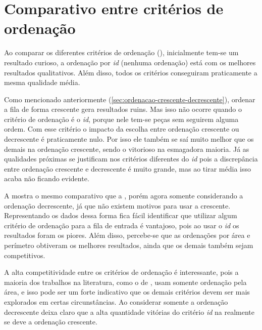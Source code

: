 \section{Comparativo entre critérios de ordenação}\label{sec:comparativo-entre-criterios-de-ordenacao}

Ao comparar os diferentes critérios de ordenação (), inicialmente tem-se
um resultado curioso, a ordenação por \textit{id} (nenhuma ordenação) está com os melhores
resultados qualitativos.
Além disso, todos os critérios conseguiram praticamente a mesma qualidade média.



Como mencionado anteriormente (\cref{sec:ordenacao-crescente-decrescente}), ordenar a fila de
forma crescente gera resultados ruins.
Mas isso não ocorre quando o critério de ordenação é o \textit{id}, porque nele tem-se peças
sem seguirem alguma ordem.
Com esse critério o impacto da escolha entre ordenação crescente ou decrescente é praticamente
nulo.
Por isso ele também se saí muito melhor que os demais na ordenação crescente, sendo o vitorioso
na esmagadora maioria.
Já as qualidades próximas se justificam nos critérios diferentes do \textit{id} pois a
discrepância entre ordenação crescente e decrescente é muito grande, mas ao tirar média isso acaba
não ficando evidente.

A  mostra o mesmo comparativo que a , porém agora
somente considerando a ordenação decrescente, já que não existem motivos para usar a crescente.
Representando os dados dessa forma fica fácil identificar que utilizar algum critério de ordenação
para a fila de entrada é vantajoso, pois ao usar o \textit{id} os resultados foram os piores.
Além disso, percebe-se que as ordenações por área e perímetro obtiveram os melhores resultados,
ainda que os demais também sejam competitivos.



A alta competitividade entre os critérios de ordenação é interessante, pois a maioria dos trabalhos
na literatura, como o de \citeauthor*{chen2019efficient}, usam somente ordenação pela área, e isso
pode ser um forte indicativo que os demais critérios devem ser mais explorados em certas
circunstâncias.
Ao considerar somente a ordenação decrescente deixa claro que a alta quantidade vitórias do critério
\textit{id} na  realmente se deve a ordenação crescente.
